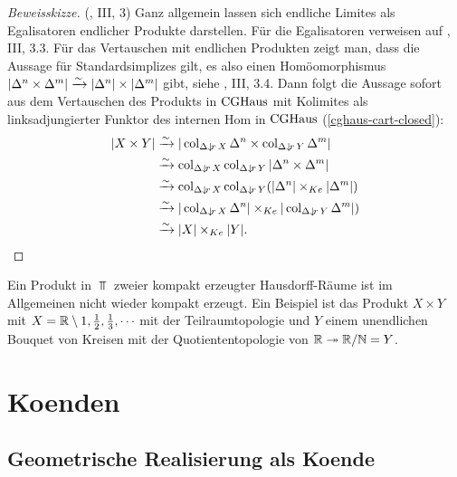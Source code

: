 \begin{proof}[Beweisskizze](\cite{Gabriel-Zisman}, III, 3)
   Ganz allgemein lassen sich endliche Limites als Egalisatoren
   endlicher Produkte darstellen. Für die Egalisatoren verweisen auf
   \cite{Gabriel-Zisman}, III, 3.3. Für das Vertauschen mit endlichen
   Produkten zeigt man, dass die Aussage für Standardsimplizes gilt,
   es also einen Homöomorphismus $|\Delta^n \times \Delta^m| \xrightarrow[]{\sim}
   |\Delta^n| \times |\Delta^m|$ gibt, siehe \cite{Gabriel-Zisman},
   III, 3.4. Dann folgt die Aussage sofort aus dem Vertauschen des
   Produkts in $\operatorname{CGHaus}$ mit Kolimites als linksadjungierter Funktor
   des internen Hom in $\operatorname{CGHaus}$ (\ref{cghaus-cart-closed}):
   \begin{align*}
     |X \times Y|
     &\iso |\col_{\slicecat{\Delta}{r}{X}} \Delta^n \times
     \col_{\slicecat{\Delta}{r}{Y}} \Delta^m| \\
     &\iso \col_{\slicecat{\Delta}{r}{X}} \col_{\slicecat{\Delta}{r}{Y}}
     |\Delta^n \times \Delta^m| \\
     &\iso \col_{\slicecat{\Delta}{r}{X}} \col_{\slicecat{\Delta}{r}{Y}}
     (|\Delta^n| \times_{Ke} |\Delta^m|) \\
     &\iso |\col_{\slicecat{\Delta}{r}{X}} \Delta^n|
     \times_{Ke} |\col_{\slicecat{\Delta}{r}{Y}} \Delta^m|) \\
     &\iso |X| \times_{Ke} |Y|.
   \end{align*}
\end{proof}
\begin{bsp} \label{ex:cg-products}
  Ein Produkt in $\Top$ zweier kompakt erzeugter Hausdorff-Räume ist
  im Allgemeinen nicht wieder kompakt erzeugt. Ein Beispiel ist das
  Produkt $X \times Y$ mit $X = \mathbb{R} \setminus {1, \frac{1}{2},
    \frac{1}{3}, \cdots }$ mit der Teilraumtopologie und $Y$ einem
  unendlichen Bouquet von Kreisen mit der Quotiententopologie von $\mathbb{R}
  \twoheadrightarrow \mathbb{R}/\mathbb{N} = Y$.
\end{bsp}

\chapter{Koenden}
\label{ch:coends}

\section{Geometrische Realisierung als Koende}


